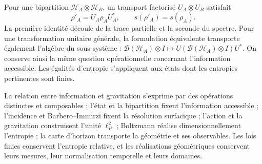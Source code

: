 Pour une bipartition \(\mathcal H_A\otimes\mathcal H_B\), un
transport factorisé \(U_A\otimes U_B\) satisfait
\[
 \rho'_A=U_A\rho_AU_A^*,\qquad s(\rho'_A)=s(\rho_A).
\]
La première identité découle de la trace partielle et la seconde du spectre.
Pour une transformation unitaire générale, la formulation équivalente transporte également
l'algèbre du sous-système :
\(\mathcal B(\mathcal H_A)\otimes I\mapsto
U(\mathcal B(\mathcal H_A)\otimes I)U^*\).
On conserve ainsi la même question opérationnelle concernant l'information
accessible. Les égalités d'entropie s'appliquent aux états dont les entropies
pertinentes sont finies.

La relation entre information et gravitation s'exprime par des
opérations distinctes et composables : l'état et la bipartition fixent
l'information accessible ; l'incidence et Barbero--Immirzi fixent la résolution
surfacique ; l'action et la gravitation construisent l'unité \(\ell_P^2\) ;
Boltzmann réalise dimensionnellement l'entropie ; la carte d'horizon
transporte la géométrie et ses observables. Les lois finies conservent
l'entropie relative, et les réalisations géométriques conservent leurs mesures,
leur normalisation temporelle et leurs domaines.
